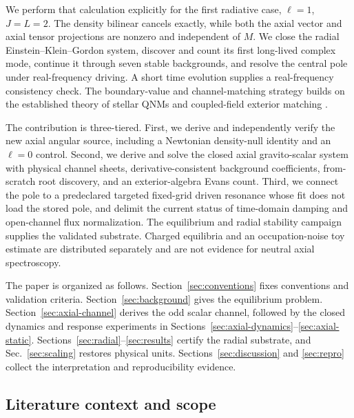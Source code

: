 \documentclass[aps,prd,preprint,onecolumn,nofootinbib,superscriptaddress,showkeys]{revtex4-2}
\begin{document}
We perform that calculation explicitly for the first radiative case, $\ell=1$, $J=L=2$.  The density bilinear cancels exactly, while both the axial vector and axial tensor projections are nonzero and independent of $M$.  We close the radial Einstein--Klein--Gordon system, discover and count its first long-lived complex mode, continue it through seven stable backgrounds, and resolve the central pole under real-frequency driving.  A short time evolution supplies a real-frequency consistency check.  The boundary-value and channel-matching strategy builds on the established theory of stellar QNMs and coupled-field exterior matching \cite{KokkotasSchmidt1999,Macedo2016}.

The contribution is three-tiered. First, we derive and independently verify the new axial angular source, including a Newtonian density-null identity and an $\ell=0$ control. Second, we derive and solve the closed axial gravito-scalar system with physical channel sheets, derivative-consistent background coefficients, from-scratch root discovery, and an exterior-algebra Evans count. Third, we connect the pole to a predeclared targeted fixed-grid driven resonance whose fit does not load the stored pole, and delimit the current status of time-domain damping and open-channel flux normalization. The equilibrium and radial stability campaign supplies the validated substrate. Charged equilibria and an occupation-noise toy estimate are distributed separately and are not evidence for neutral axial spectroscopy.

The paper is organized as follows. Section~\ref{sec:conventions} fixes conventions and validation criteria. Section~\ref{sec:background} gives the equilibrium problem. Section~\ref{sec:axial-channel} derives the odd scalar channel, followed by the closed dynamics and response experiments in Sections~\ref{sec:axial-dynamics}--\ref{sec:axial-static}. Sections~\ref{sec:radial}--\ref{sec:results} certify the radial substrate, and Sec.~\ref{sec:scaling} restores physical units. Sections~\ref{sec:discussion} and \ref{sec:repro} collect the interpretation and reproducibility evidence.

\subsection{Literature context and scope}
\end{document}
